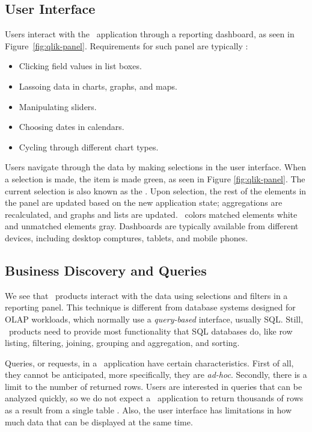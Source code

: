 \subsection{User Interface}
\label{sub:User Interface}
Users interact with the \bd~application through a reporting dashboard, as seen in Figure~\ref{fig:qlik-panel}. Requirements for such panel are typically \cite{Qlik2014-vd}:
\begin{itemize}
  \item Clicking field values in list boxes.
  \item Lassoing data in charts, graphs, and maps.
  \item Manipulating sliders.
  \item Choosing dates in calendars.
  \item Cycling through different chart types.
\end{itemize}

Users navigate through the data by making selections in the user interface. When a selection is made, the item is made green, as seen in Figure \ref{fig:qlik-panel}. The current selection is also known as the . Upon selection, the rest of the elements in the panel are updated based on the new application state; aggregations are recalculated, and graphs and lists are updated. \qlikview~colors matched elements white and unmatched elements gray. Dashboards are typically available from different devices, including desktop comptures, tablets, and mobile phones.

\subsection{Business Discovery and Queries}
\label{sub:Business Discovery and QueriesL}

We see that \bd~products interact with the data using selections and filters in a reporting panel. This technique is different from database systems designed for OLAP workloads, which normally use a \textit{query-based} interface, usually SQL. Still, \bd~products need to provide most functionality that SQL databases do, like row listing, filtering, joining, grouping and aggregation, and sorting.

Queries, or requests, in a \bd~application have certain characteristics. First of all, they cannot be anticipated, more specifically, they are \textit{ad-hoc}. Secondly, there is a limit to the number of returned rows. Users are interested in queries that can be analyzed quickly, so we do not expect a \bd~application to return thousands of rows as a result from a single table \cite{Ferrari2012-hm}. Also, the user interface has limitations in how much data that can be displayed at the same time. 

